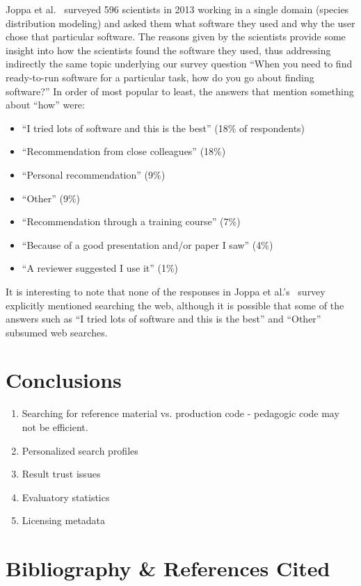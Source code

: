 \documentclass{casicswhitepaper}
\begin{document}
Joppa et al.~\cite{joppa2013troubling} surveyed 596 scientists in 2013 working in a single domain (species distribution modeling) and asked them what software they used and why the user chose that particular software.  The reasons given by the scientists provide some insight into how the scientists found the software they used, thus addressing indirectly the same topic underlying our survey question ``When you need to find ready-to-run software for a particular task, how do you go about finding software?''  In order of most popular to least, the answers that mention something about ``how'' were:
\begin{itemize}

\item ``I tried lots of software and this is the best'' (18\% of respondents)
\item ``Recommendation from close colleagues'' (18\%)
\item ``Personal recommendation'' (9\%)
\item ``Other'' (9\%)
\item ``Recommendation through a training course'' (7\%)
\item ``Because of a good presentation and/or paper I saw'' (4\%)
\item ``A reviewer suggested I use it'' (1\%)

\end{itemize}

It is interesting to note that none of the responses in Joppa et al.'s~\cite{joppa2013troubling} survey explicitly mentioned searching the web, although it is possible that some of the answers such as ``I tried lots of software and this is the best'' and ``Other'' subsumed web searches.





\section{Conclusions}

\begin{enumerate}
\item Searching for reference material vs. production code - pedagogic code may not be efficient.
\item Personalized search profiles
\item Result trust issues
\item Evaluatory statistics 
\item Licensing metadata
\end{enumerate}

\clearpage
\section*{Bibliography \& References Cited}
\renewcommand{\refname}{}               %
\vspace*{-2ex}


\end{document}
